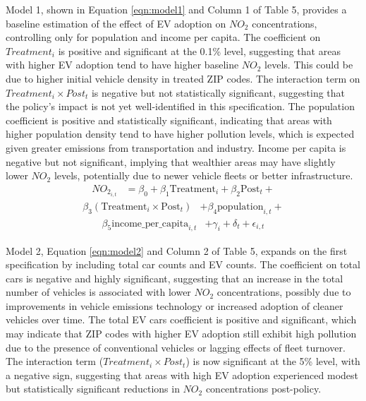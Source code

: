 \documentclass[12pt]{article}
\begin{document}
\begin{multicols}{2}
		Model 1, shown in Equation \eqref{eqn:model1} and Column 1 of Table 5, provides a baseline estimation of the effect of EV adoption on $NO_2$ concentrations, controlling only for population and income per capita. The coefficient on $Treatment_i$ is positive and significant at the 0.1\% level, suggesting that areas with higher EV adoption tend to have higher baseline $NO_2$ levels. This could be due to higher initial vehicle density in treated ZIP codes. The interaction term on $Treatment_i \times Post_t$ is negative but not statistically significant, suggesting that the policy's impact is not yet well-identified in this specification. The population coefficient is positive and statistically significant, indicating that areas with higher population density tend to have higher pollution levels, which is expected given greater emissions from transportation and industry. Income per capita is negative but not significant, implying that wealthier areas may have slightly lower $NO_2$ levels, potentially due to newer vehicle fleets or better infrastructure.
		\begin{align}
			NO_{2_{i,t}} &= \beta_0 + \beta_1 \text{Treatment}_{i} + \beta_2 \text{Post}_{t} + \nonumber \end{align} \begin{align}
			\beta_3 (\text{Treatment}_{i} \times \text{Post}_{t}) 
			& + \beta_4 \text{population}_{i,t} + \nonumber \end{align} \begin{align} \beta_5 \text{income\_per\_capita}_{i,t}
			& + \gamma_i + \delta_t + \epsilon_{i,t} \label{eqn:model1}
		\end{align}
		
		Model 2, Equation \eqref{eqn:model2} and Column 2 of Table 5, expands on the first specification by including total car counts and EV counts. The coefficient on total cars is negative and highly significant, suggesting that an increase in the total number of vehicles is associated with lower $NO_2$ concentrations, possibly due to improvements in vehicle emissions technology or increased adoption of cleaner vehicles over time. The total EV cars coefficient is positive and significant, which may indicate that ZIP codes with higher EV adoption still exhibit high pollution due to the presence of conventional vehicles or lagging effects of fleet turnover. The interaction term ($Treatment_i \times Post_t$) is now significant at the 5\% level, with a negative sign, suggesting that areas with high EV adoption experienced modest but statistically significant reductions in $NO_2$ concentrations post-policy. 
		

\end{multicols}
\end{document}
